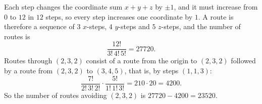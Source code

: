 Each step changes the coordinate sum $x+y+z$ by $\pm1$, and it must increase from $0$ to $12$ in $12$ steps, so every step increases one coordinate by $1$. A route is therefore a sequence of $3$ $x$-steps, $4$ $y$-steps and $5$ $z$-steps, and the number of routes is
\[\dfrac{12!}{3!\,4!\,5!}=27720.\]
Routes through $(2,3,2)$ consist of a route from the origin to $(2,3,2)$ followed by a route from $(2,3,2)$ to $(3,4,5)$, that is, by steps $(1,1,3)$:
\[\dfrac{7!}{2!\,3!\,2!}\cdot\dfrac{5!}{1!\,1!\,3!}=210\cdot20=4200.\]
So the number of routes avoiding $(2,3,2)$ is $27720-4200=\boxed{23520}$.
